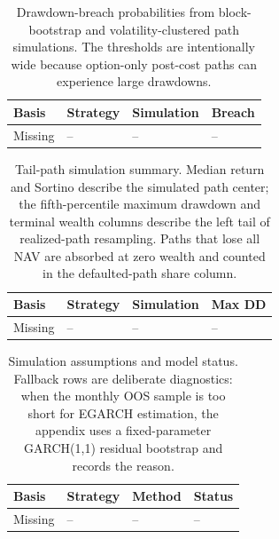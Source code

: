 \begin{table}[H]
\centering
\scriptsize
{}
  {\resizebox{\textwidth}{!}{}}
  {\begin{tabular}{llll}\toprule Basis & Strategy & Simulation & Breach \\\midrule Missing & -- & -- & -- \\\bottomrule\end{tabular}}
\caption{Drawdown-breach probabilities from block-bootstrap and volatility-clustered path
simulations. The thresholds are intentionally wide because option-only post-cost paths can
experience large drawdowns.}
\label{tab:simulation_breach_app}
\end{table}

\begin{table}[H]
\centering
\scriptsize
{}
  {\resizebox{\textwidth}{!}{}}
  {\begin{tabular}{llll}\toprule Basis & Strategy & Simulation & Max DD \\\midrule Missing & -- & -- & -- \\\bottomrule\end{tabular}}
\caption{Tail-path simulation summary. Median return and Sortino describe the simulated
path center; the fifth-percentile maximum drawdown and terminal wealth columns describe the
left tail of realized-path resampling. Paths that lose all NAV are absorbed at zero
wealth and counted in the defaulted-path share column.}
\label{tab:simulation_summary_app}
\end{table}

\begin{table}[H]
\centering
\scriptsize
{}
  {\resizebox{\textwidth}{!}{}}
  {\begin{tabular}{llll}\toprule Basis & Strategy & Method & Status \\\midrule Missing & -- & -- & -- \\\bottomrule\end{tabular}}
\caption{Simulation assumptions and model status. Fallback rows are deliberate diagnostics:
when the monthly OOS sample is too short for EGARCH estimation, the appendix uses a
fixed-parameter GARCH(1,1) residual bootstrap and records the reason.}
\label{tab:simulation_assumptions_app}
\end{table}

